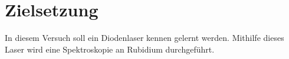 \section{Zielsetzung}
\label{sec:zielsetzung}
In diesem Versuch soll ein Diodenlaser kennen gelernt werden. Mithilfe dieses Laser wird eine Spektroskopie an Rubidium durchgeführt.
